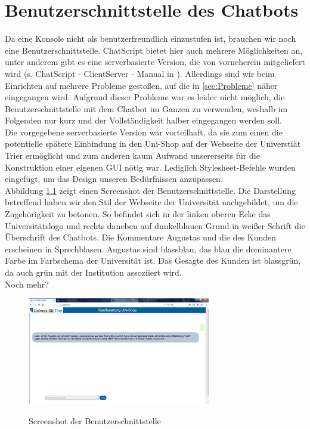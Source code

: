 \chapter{Benutzerschnittstelle des Chatbots}
\label{sec:Benutzerschnittstelle}

Da eine Konsole nicht als benutzerfreundlich einzustufen ist, brauchen wir noch eine Benutzerschnittstelle. ChatScript bietet hier auch mehrere Möglichkeiten an, unter anderem gibt es eine serverbasierte Version, die von vorneherein mitgeliefert wird (s. ChatScript - ClientServer - Manual in \citep{chatscript2019}). Allerdings sind wir beim Einrichten auf mehrere Probleme gestoßen, auf die in \ref{sec:Probleme} näher eingegangen wird. Aufgrund dieser Probleme war es leider nicht möglich, die Benutzerschnittstelle mit dem Chatbot im Ganzen zu verwenden, weshalb im Folgenden nur kurz und der Vollständigkeit halber eingegangen werden soll.\\
Die vorgegebene serverbasierte Version war vorteilhaft, da sie zum einen die potentielle spätere Einbindung in den Uni-Shop auf der Webseite der Universtiät Trier ermöglicht und zum anderen kaum Aufwand unsererseits für die Konstruktion einer eigenen GUI nötig war. Lediglich Stylesheet-Befehle wurden eingefügt, um das Design unseren Bedürfnissen anzupassen.\\
Abbildung \ref{ScreenshotGUI} zeigt einen Screenshot der Benutzerschnittstelle. Die Darstellung betreffend haben wir den Stil der Webseite der Universität nachgebildet, um die Zugehörigkeit zu betonen. So befindet sich in der linken oberen Ecke das Universitätslogo und rechts daneben auf dunkelblauen Grund in weißer Schrift die Überschrift des Chatbots. Die Kommentare Augustas und die des Kunden erscheinen in Sprechblasen. Augustas sind blassblau, das blau die dominantere Farbe im Farbschema der Universität ist. Das Gesagte des Kunden ist blassgrün, da auch grün mit der Institution assoziiert wird.\\

\textcolor[rgb]{1,0,0}{Noch mehr?}


\begin{figure}
\begin{center}
{\includegraphics[width=8cm]{BILDER/gui.png}}
\end{center}
	\caption{Screenshot der Benutzerschnittstelle}
	\label{ScreenshotGUI}
\end{figure}
